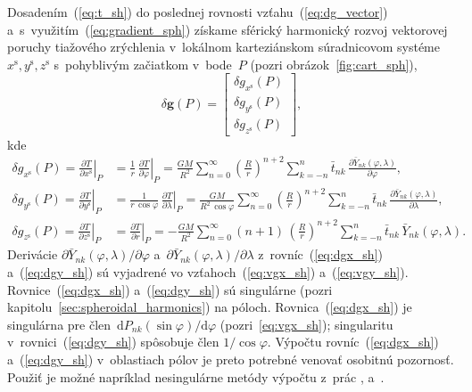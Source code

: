 \documentclass[a4paper, 12pt]{book}
\newcommand{\diff}{\mathrm d}
\let\vec\mathbf
\begin{document}
Dosadením~(\ref{eq:t_sh}) do poslednej rovnosti vzťahu~(\ref{eq:dg_vector}) 
a~s~využitím~(\ref{eq:gradient_sph}) získame sférický harmonický rozvoj 
vektorovej poruchy tiažového zrýchlenia v~lokálnom karteziánskom súradnicovom 
systéme~$x^\mathrm{s}, y^\mathrm{s}, z^\mathrm{s}$ s~pohyblivým začiatkom 
v~bode~$P$ (pozri obrázok~\ref{fig:cart_sph}),
%
\begin{equation}
\label{eq:dg_vec_sph}
\delta \vec g(P) =
%
\begin{bmatrix}
\delta g_{x^\mathrm{s}}(P)\\
\delta g_{y^\mathrm{s}}(P)\\
\delta g_{z^\mathrm{s}}(P)
\end{bmatrix}
%
{,}
\end{equation}
%
kde
%
\begin{align}
\label{eq:dgx_sh}
\delta g_{x^\mathrm{s}}(P) = \left.\frac{\partial T}{\partial 
x^\mathrm{s}}\right|_P &= \frac{1}{r} \, \left.\frac{\partial T}{\partial 
\varphi}\right|_P = \frac{GM}{R^2} \sum_{n = 0}^\infty \left( \frac{R}{r} 
\right)^{n + 2} \sum_{k = -n}^{n} \bar{t}_{nk} \, \frac{\partial 
\bar{Y}_{nk}(\varphi, \lambda)}{\partial \varphi}{,}\\
%
\label{eq:dgy_sh}
\delta g_{y^\mathrm{s}}(P) = \left.\frac{\partial T}{\partial 
y^\mathrm{s}}\right|_P &= \frac{1}{r \, \cos\varphi} \, \left.\frac{\partial 
T}{\partial \lambda}\right|_P = \frac{GM}{R^2 \, \cos\varphi} \sum_{n 
= 0}^\infty \left( \frac{R}{r} \right)^{n + 2} \sum_{k = -n}^{n}\bar{t}_{nk} \, 
\frac{\partial \bar{Y}_{nk}(\varphi, \lambda)}{\partial \lambda}{,}\\
%
\label{eq:dgz_sh}
\delta g_{z^\mathrm{s}}(P) = \left.\frac{\partial T}{\partial 
z^\mathrm{s}}\right|_P &= \left.\frac{\partial T}{\partial r}\right|_P 
= - \frac{GM}{R^2} \sum_{n = 0}^\infty (n + 1) \, \left( \frac{R}{r} \right)^{n 
+ 2} \sum_{k = -n}^{n} \bar{t}_{nk} \, \bar{Y}_{nk}(\varphi, \lambda){.}
\end{align}
%
Derivácie $\partial \bar{Y}_{nk}(\varphi, \lambda) \slash \partial \varphi$ 
a~$\partial \bar{Y}_{nk}(\varphi, \lambda) \slash \partial \lambda$ 
z~rovníc~(\ref{eq:dgx_sh}) a~(\ref{eq:dgy_sh}) sú vyjadrené vo 
vzťahoch~(\ref{eq:vgx_sh}) a~(\ref{eq:vgy_sh}).  Rovnice~(\ref{eq:dgx_sh}) 
a~(\ref{eq:dgy_sh}) sú singulárne (pozri 
kapitolu~\ref{sec:spheroidal_harmonics}) na póloch.  Rovnica~(\ref{eq:dgx_sh}) 
je singulárna pre člen~$\diff P_{nk}(\sin\varphi) \slash \diff \varphi$ 
(pozri~\ref{eq:vgx_sh}); singularitu v~rovnici~(\ref{eq:dgy_sh}) spôsobuje člen 
$1 \slash \cos\varphi$.  Výpočtu rovníc~(\ref{eq:dgx_sh}) a~(\ref{eq:dgy_sh}) 
v~oblastiach pólov je preto potrebné venovať osobitnú pozornosť.  Použiť je 
možné napríklad nesingulárne metódy výpočtu z~prác \textcite{Petrovskaya2012}, 
\textcite{Sebera2013} a~\textcite{Ivanov2018}.
\end{document}

